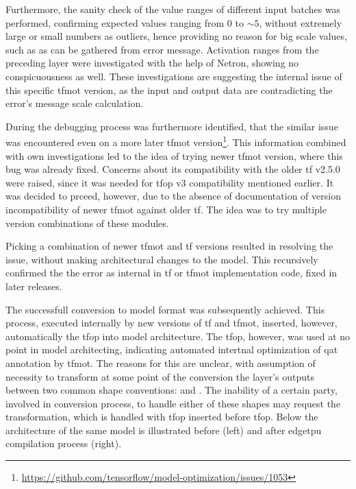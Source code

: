 {Furthermore, the sanity check of the value ranges of different input batches was performed, confirming expected values ranging from 0 to $\sim5$,
without extremely large or small numbers as outliers, hence providing no reason for big scale values, such as  as can be gathered from error message.
Activation ranges from the preceding  layer were investigated with the help of Netron, showing no conspicuousness as well.
These investigations are suggesting the internal issue of this specific \gls{tfmot} version, as the input and output data are contradicting the error's message scale calculation.


During the debugging process was furthermore identified,
that the similar issue was encountered even on a more later \gls{tfmot} version\footnote{\url{https://github.com/tensorflow/model-optimization/issues/1053}}.
This information combined with own investigations led to the idea of trying newer \gls{tfmot} version, where this bug was already fixed.
Concerns about its compatibility with the older \gls{tf} v2.5.0 were raised, since it was needed for \gls{tfop} v3 compatibility mentioned earlier.
It was decided to prceed, however, due to the absence of documentation of version incompatibility of newer \gls{tfmot} against older \gls{tf}.
The idea was to try multiple version combinations of these modules.

Picking a combination of newer \gls{tfmot} and \gls{tf} versions resulted in resolving the issue, without making architectural changes to the model.
This recursively confirmed the the error as internal in \gls{tf} or \gls{tfmot} implementation code, fixed in later releases.

The successfull conversion to  model format was subsequently achieved. This process, executed internally by new versions of \gls{tf} and \gls{tfmot},
inserted, however, automatically the  \gls{tfop} into model architecture. The  \gls{tfop}, however, was used at no point in model architecting,
indicating automated intertnal optimization of \gls{qat} annotation by \gls{tfmot}. The reasons for this are unclear,
with assumption of necessity to transform at some point of the conversion the layer's outputs between two common shape conventions:
 and . The inability of a certain party, involved in conversion process,
to handle either of these shapes may request the transformation,
which is handled with  \gls{tfop} inserted before  \gls{tfop}. Below the architecture of the same model is illustrated before (left)
and after \gls{edgetpu} compilation process (right).

}
